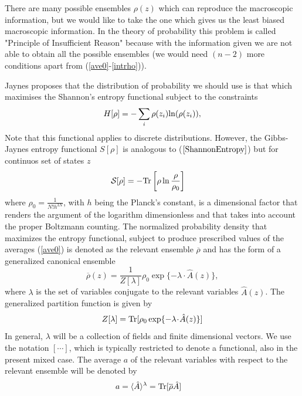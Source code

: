 \documentclass[a4paper,openright,12pt]{book}
\begin{document}
There are many possible ensembles $\rho(z)$ which can reproduce the macroscopic information, but we would like to take the one which gives us the least biased macroscopic information.
In the theory of probability this problem is called "Principle of Insufficient Reason" because with the information given we are not able to obtain all the possible ensembles (we would need $(n-2)$ more conditions apart from (\ref{ave0}-\ref{intrho})).

Jaynes proposes that the distribution of probability we should use is that which maximises the Shannon's entropy functional subject to the constraints 
\begin{align}
    H[\rho] = -\sum_i\rho(z_i){\rm ln}(\rho(z_i)),
    \label{ShannonEntropy}
\end{align}
Note that this functional applies to discrete distributions. However, the Gibbs-Jaynes entropy functional $S[\rho]$ is analogous to ($\ref{ShannonEntropy}$) but for continuos set of states $z$
\begin{align}
 {\cal S}[\rho]&=-{\rm Tr}\left[\rho\ln\frac{\rho}{\rho_0}\right]
\label{entropy}
\end{align}
where  $\rho_0=\frac{1}{N!h^{3N}}$,   with  $h$  being   the  Planck's
constant, is  a dimensional  factor that renders  the argument  of the
logarithm  dimensionless  and  that  takes  into  account  the  proper
Boltzmann  counting.  The normalized  probability  density  that maximizes  the
entropy  functional,  subject  to  produce prescribed  values  of  the
averages  (\ref{ave0})  is  denoted  as the relevant  ensemble
$\overline{\rho}$ and has the form of a generalized canonical ensemble
\begin{equation}
\overline{\rho}(z) = \frac{1}{Z[\lambda]} \rho_0\exp\{-\lambda\!\cdot\!\hat{A}(z)\}, 
\label{relens1}
\end{equation}
where
$\lambda$ is the set of variables conjugate  to the relevant
variables $\hat{A}(z)$.  The generalized partition function is given by
\begin{equation}
Z[\lambda] = {\rm Tr}[\rho_0\exp
    \{-\lambda\!\cdot\!\hat{A}(z)\}]
\end{equation}
In general, $\lambda$  will be a collection of  fields and finite
dimensional  vectors.  We  use  the notation  $[\cdots]$,  which  is
typically restricted  to denote  a functional,  also in  the present
mixed case.  The average $a$ of the relevant variables with respect
to the relevant ensemble will be denoted by
\begin{align}
  a &=\langle \hat{A}\rangle^\lambda ={\rm Tr}[\overline{\rho}\hat{A}]
\end{align}
\end{document}
